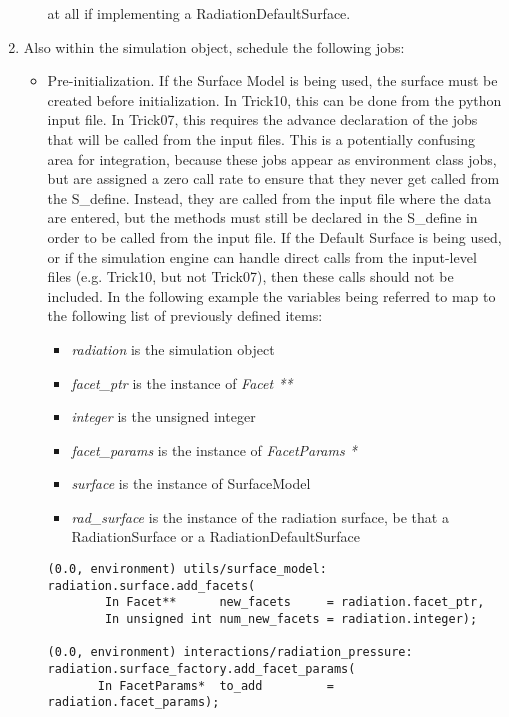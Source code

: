 \begin{enumerate}
\begin{enumerate}
      at all if implementing a RadiationDefaultSurface.
  \end{enumerate}
  \item{} Also within the simulation object, schedule the following jobs:
    \begin{itemize}
      \item{Pre-initialization}.  \newline
        If the Surface Model is being used,
        the surface must be created before initialization.  In Trick10, this can be done from the python input file.  In Trick07, this requires the advance declaration of the jobs that will be called from the input files.  This is a
        potentially confusing area for integration, because
        these jobs appear as environment class jobs, but are assigned a zero
        call rate to ensure that they never get called from the S\_define.
        Instead, they are called from the input file where the data are entered,
        but the methods must still be declared in the S\_define in order to be
        called from the input file.
        If the Default Surface is being used, or if the simulation engine can handle direct calls from the input-level files (e.g. Trick10, but not Trick07), then these calls should not be included.
        In the following example the variables being referred to map to the
        following list of previously defined items:
        \begin{itemize}
          \item \textit{radiation} is the simulation object
          \item \textit{facet\_ptr} is the instance of \textit{Facet **}
          \item \textit{integer} is the unsigned integer
          \item \textit{facet\_params} is the instance of \textit{FacetParams *}
          \item \textit{surface} is the instance of SurfaceModel
          \item \textit{rad\_surface} is the instance of the radiation surface, be that a
             RadiationSurface or a RadiationDefaultSurface
        \end{itemize}
\begin{verbatim}
(0.0, environment) utils/surface_model:
radiation.surface.add_facets(
        In Facet**      new_facets     = radiation.facet_ptr,
        In unsigned int num_new_facets = radiation.integer);

(0.0, environment) interactions/radiation_pressure:
radiation.surface_factory.add_facet_params(
       In FacetParams*  to_add         = radiation.facet_params);
\end{verbatim}


\end{itemize}
\end{enumerate}
